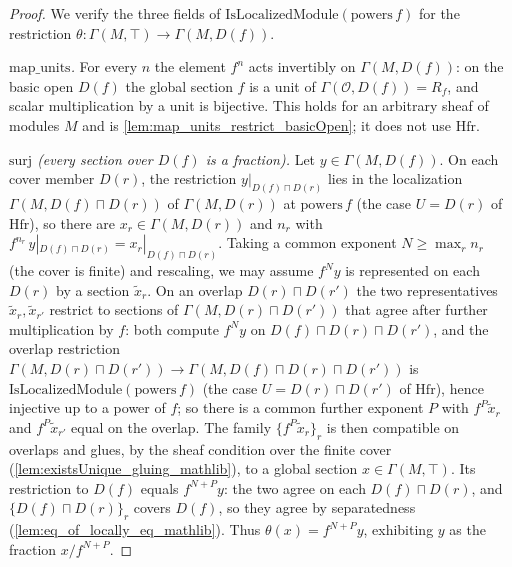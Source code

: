 \begin{proof}
  We verify the three fields of \(\mathrm{IsLocalizedModule}(\mathrm{powers}\,f)\) for the restriction
  \(\theta : \Gamma(M, \top) \to \Gamma(M, D(f))\).

  \emph{\(\mathrm{map\_units}\).} For every \(n\) the element \(f^n\) acts invertibly on
  \(\Gamma(M, D(f))\): on the basic open \(D(f)\) the global section \(f\) is a unit of
  \(\Gamma(\mathcal{O}, D(f)) = R_f\), and scalar multiplication by a unit is bijective. This holds
  for an arbitrary sheaf of modules \(M\) and is \cref{lem:map_units_restrict_basicOpen}; it does not
  use \(\mathrm{Hfr}\).

  \emph{\(\mathrm{surj}\) (every section over \(D(f)\) is a fraction).} Let
  \(y \in \Gamma(M, D(f))\). On each cover member \(D(r)\), the restriction
  \(y|_{D(f) \sqcap D(r)}\) lies in the localization \(\Gamma(M, D(f) \sqcap D(r))\) of
  \(\Gamma(M, D(r))\) at \(\mathrm{powers}\,f\) (the case \(U = D(r)\) of \(\mathrm{Hfr}\)), so there
  are \(x_r \in \Gamma(M, D(r))\) and \(n_r\) with \(f^{n_r}\, y|_{D(f)\sqcap D(r)} = x_r|_{D(f)\sqcap
  D(r)}\). Taking a common exponent \(N \ge \max_r n_r\) (the cover is finite) and rescaling, we may
  assume \(f^{N} y\) is represented on each \(D(r)\) by a section \(\tilde x_r\). On an overlap
  \(D(r) \sqcap D(r')\) the two representatives \(\tilde x_r, \tilde x_{r'}\) restrict to sections of
  \(\Gamma(M, D(r) \sqcap D(r'))\) that agree after further multiplication by \(f\): both compute
  \(f^{N} y\) on \(D(f) \sqcap D(r) \sqcap D(r')\), and the overlap restriction
  \(\Gamma(M, D(r)\sqcap D(r')) \to \Gamma(M, D(f) \sqcap D(r) \sqcap D(r'))\) is
  \(\mathrm{IsLocalizedModule}(\mathrm{powers}\,f)\) (the case \(U = D(r) \sqcap D(r')\) of
  \(\mathrm{Hfr}\)), hence injective up to a power of \(f\); so there is a common further exponent
  \(P\) with \(f^{P}\tilde x_r\) and \(f^{P}\tilde x_{r'}\) equal on the overlap. The family
  \(\{f^{P}\tilde x_r\}_r\) is then compatible on overlaps and glues, by the sheaf condition over the
  finite cover (\cref{lem:existsUnique_gluing_mathlib}), to a global section
  \(x \in \Gamma(M, \top)\). Its restriction to \(D(f)\) equals \(f^{N+P} y\): the two agree on each
  \(D(f) \sqcap D(r)\), and \(\{D(f)\sqcap D(r)\}_r\) covers \(D(f)\), so they agree by separatedness
  (\cref{lem:eq_of_locally_eq_mathlib}). Thus \(\theta(x) = f^{N+P} y\), exhibiting \(y\) as the
  fraction \(x / f^{N+P}\).


\end{proof}
